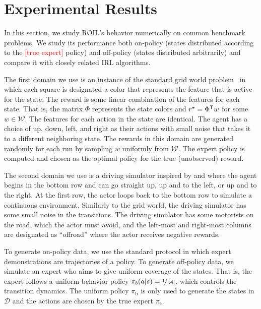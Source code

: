 \documentclass[10pt]{article}
\renewcommand{\cite}{\citep}
\theoremstyle{plain}
\theoremstyle{remark}
\newcommand{\gersi}[1]{\textcolor{red}{[#1]}}
\begin{document}

\section{Experimental Results}
\label{sec:experimental-results}


In this section, we study ROIL's behavior numerically on common benchmark problems. We study its performance both on-policy (states distributed according to the \gersi{true expert} policy) and off-policy (states distributed arbitrarily) and compare it with closely related IRL algorithms.

The first domain we use is an instance of the standard grid world problem~\cite{abbeel2004} in which each square is designated a color that represents the feature that is active for the state. The reward is some linear combination of the features for each state. That is, the matrix $\Phi$ represents the state colors and  $r^{\mathnormal{\star}}  = \Phi^{\mathsf{T}} w$ for some $w \in \mathcal{W}$. The features for each action in the state are identical. The agent has a choice of up, down, left, and right as their actions with small noise that takes it to a different neighboring state. The rewards in this domain are generated randomly for each run by sampling $w$ uniformly from $\mathcal{W}$. The expert policy is computed and chosen as the optimal policy for the true (unobserved) reward.

The second domain we use is a driving simulator inspired by \citet{abbeel2004} and \citet{Syed2008} where the agent begins in the bottom row and can go straight up, up and to the left, or up and to the right. At the first row, the actor loops back to the bottom row to simulate a continuous environment. Similarly to the grid world, the driving simulator has some small noise in the transitions. The driving simulator has some motorists on the road, which the actor must avoid, and the left-most and right-most columns are designated as ``offroad'' where the actor receives negative rewards.

To generate on-policy data, we use the standard protocol in which expert demonstrations are trajectories of a policy. To generate off-policy data, we simulate an expert who aims to give uniform coverage of the states. That is, the expert follows a uniform behavior policy  $\pi_b(a|s) = \nicefrac{1}{\lvert \mathcal{A} \rvert}$, which controls the transition dynamics. The uniform policy $\pi_{\mathrm{b}}$ is only used to generate the states in $\mathcal{D}$ and the actions are chosen by the true expert $\pi_{\mathrm{e}}$.
\end{document}
